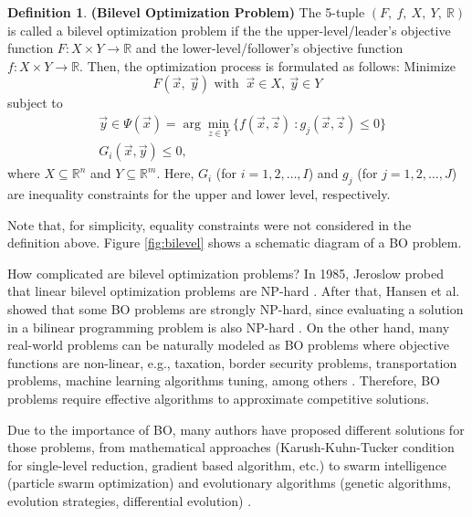 \documentclass[conference]{IEEEtran}
\theoremstyle{definition}
\newtheorem{definition}{Definition}[section]
\begin{document}
\begin{definition}\textbf{(Bilevel Optimization Problem)}
    The 5-tuple $(F, \ f, \ X, \ Y, \ \mathbb{R} )$ is called a bilevel optimization
    problem if the the upper-level/leader's objective function
    $F: X \times Y \to \mathbb{R}$ and the lower-level/follower's objective
    function $f: X \times Y \to \mathbb{R}$. Then, the optimization process is
    formulated as follows:
    \noindent
    Minimize
    \begin{equation}
        F(\vec{x},\ \vec{y}) \text{ with } \ \vec{x} \in X , \ \vec{y} \in Y 
        \label{eqn:minF1}
    \end{equation}
    subject to
    \begin{align}
        \label{eqn:y-arg}
        &\vec{y} \in \Psi(\vec{x}) = \arg \min_{z\in Y} \{ f(\vec{x}, \vec{z}) \ : g_j(\vec{x}, \vec{z})  \leq 0 \} \\
        &  G_{i}(\vec{x}, \vec{y}) \leq 0,
    \end{align}
    where $X \subseteq \mathbb{R}^n $
    and $Y \subseteq \mathbb{R}^m$.
    Here, $G_i$ (for $i = 1,2,\ldots,I$) and $g_j$ (for $j = 1,2,\ldots,J$) are
    inequality constraints for the upper and lower level, respectively.
\end{definition}
% 
Note that, for simplicity, equality constraints were not considered in the definition
above. Figure \ref{fig:bilevel} shows a schematic diagram of a BO problem.
% 

How complicated are bilevel optimization problems?  In 1985, Jeroslow probed that
linear bilevel optimization problems are NP-hard \cite{jeroslow1985polynomial}.
After that, Hansen et al. showed that some BO problems are strongly NP-hard, since
evaluating a solution in a bilinear programming problem is also NP-hard
\cite{hansen1992new,vicente1994descent}. On the other hand, many real-world problems can
be naturally modeled as BO problems \cite{sinha2018review} where objective functions
are non-linear, e.g., taxation, border security problems, transportation problems,
machine learning algorithms tuning, among others \cite{bard2013practical,sinha2018review,arroyo2010bilevel}.
Therefore, BO problems require effective algorithms to approximate competitive
solutions.

Due to the importance of BO, many authors have proposed different solutions
for those problems, from mathematical approaches (Karush-Kuhn-Tucker condition for
single-level reduction, gradient based algorithm, etc.) \cite{dempe2002foundations,shi2005extended}
to swarm intelligence (particle swarm optimization) and evolutionary algorithms
(genetic algorithms, evolution strategies, differential evolution)
\cite{derrac2011practical,angelo2013differential,li2006hierarchical}.
\end{document}
